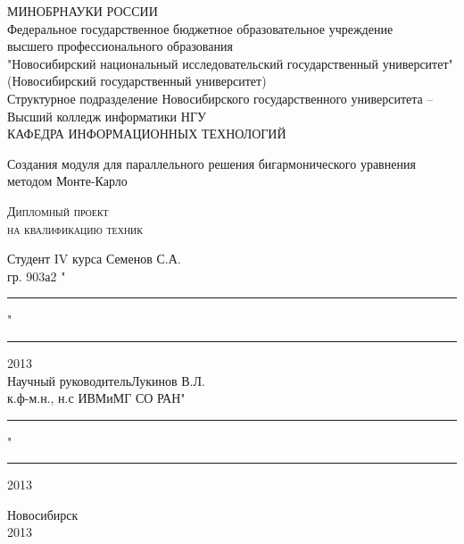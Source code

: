 \begin{titlepage}

\begin{center}
МИНОБРНАУКИ РОССИИ\\
Федеральное государственное бюджетное образовательное учреждение\\
высшего профессионального образования \\
\hspace{-10mm}"Новосибирский национальный исследовательский государственный университет"\\
(Новосибирский государственный университет)\\
\hspace{-7mm}Структурное подразделение Новосибирского государственного университета -- \\
Высший колледж информатики НГУ\\
КАФЕДРА ИНФОРМАЦИОННЫХ ТЕХНОЛОГИЙ
\end{center}


\vspace{8em}

\begin{center}
\Large Создания модуля для параллельного решения бигармонического уравнения методом Монте-Карло 
\end{center}

\vspace{2.5em}

\begin{center}
\textsc{Дипломный проект\\ на квалификацию техник }
\end{center}

\vspace{6em}

\begin{flushleft}
 Студент IV курса \hfill Семенов С.А. \\
гр. 903а2 \hfill "\rule{3ex}{0,1mm}"\rule{10ex}{0,1mm}2013 \\
\vspace{1.5em}
Научный руководитель\hfill Лукинов В.Л.\\
к.ф-м.н., н.с ИВМиМГ СО РАН\hfill "\rule{3ex}{0,1mm}"\rule{10ex}{0,1mm}2013 \\
\end{flushleft}

\vspace{\fill}
\begin{center}
Новосибирск\\ 2013
\end{center}
\end{titlepage}
